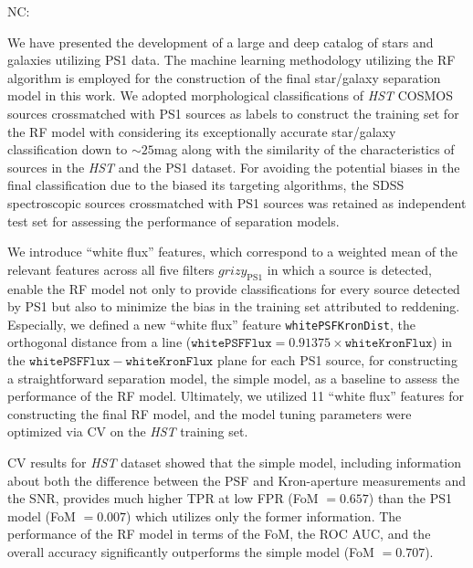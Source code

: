 \documentclass[twocolumn, dvipdfmx]{aastex62}
\newcommand{\NC}[1]{{\color{brown} NC: {#1}}}
\begin{document}
\NC{
We have presented the development of a large and deep catalog 
of stars and galaxies utilizing PS1 data. 
The machine learning methodology utilizing the RF algorithm is employed 
for the construction of the final star/galaxy separation model in this work. 
We adopted morphological classifications of {\it HST} COSMOS sources 
crossmatched with PS1 sources as labels 
to construct the training set for the RF model 
with considering its exceptionally accurate star/galaxy classification down to $\sim 25$mag 
along with the similarity of the characteristics of sources in the {\it HST} and the PS1 dataset. 
For avoiding the potential biases in the final classification 
due to the biased its targeting algorithms, 
the SDSS spectroscopic sources crossmatched with PS1 sources was retained 
as independent test set for assessing the performance of separation models. 

We introduce ``white flux'' features, which correspond to a weighted mean of the 
relevant features across all five filters $grizy_{\mathrm {PS1}}$ in which a source is detected, 
enable the RF model not only to provide classifications for every source detected by PS1 
but also to minimize the bias in the training set attributed to reddening. 
Especially, we defined a new ``white flux'' feature \texttt{whitePSFKronDist}, 
the orthogonal distance from a line 
($\mathtt{whitePSFFlux} = 0.91375 \times \mathtt{whiteKronFlux}$) 
in the $\mathtt{whitePSFFlux} - \mathtt{whiteKronFlux}$ plane for each PS1 source, 
for constructing a straightforward separation model, the simple model, 
as a baseline to assess the performance of the RF model. 
Ultimately, we utilized 11 ``white flux'' features for constructing the final RF model, 
and the model tuning parameters were optimized via CV on the {\it HST} training set.

CV results for {\it HST} dataset showed that the simple model, 
including information about both the difference between the 
PSF and Kron-aperture measurements and the SNR, 
provides much higher TPR at low FPR (FoM $= 0.657$) than the PS1 model (FoM $= 0.007$) 
which utilizes only the former information. 
The performance of the RF model in terms of the FoM, the ROC AUC, and the overall accuracy 
significantly outperforms the simple model (FoM $=0.707$). 

}
\end{document}
